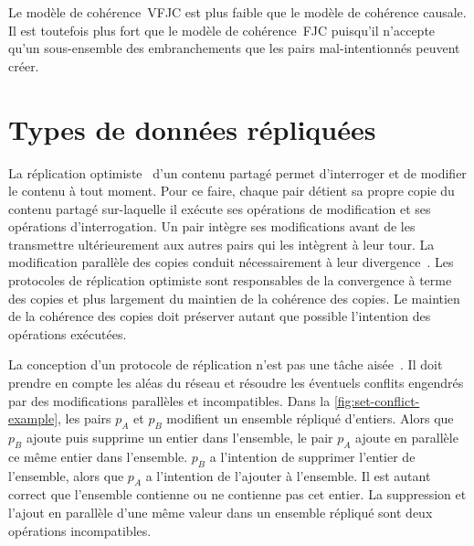Le modèle de cohérence~\ac{VFJC} est plus faible que le modèle de cohérence causale.
Il est toutefois plus fort que le modèle de cohérence~\ac{FJC} puisqu'il n'accepte qu'un sous-ensemble des embranchements que les pairs mal-intentionnés peuvent créer.




\clearpage %
\section{Types de données répliquées}\label{sec:crdt}

La réplication optimiste~\autocite{saito_2005_optimisticreplication} d'un contenu partagé permet d'interroger et de modifier le contenu à tout moment.
Pour ce faire, chaque pair détient sa propre copie du contenu partagé sur-laquelle il exécute ses opérations de modification et ses opérations d'interrogation.
Un pair intègre ses modifications avant de les transmettre ultérieurement aux autres pairs qui les intègrent à leur tour.
La modification parallèle des copies conduit nécessairement à leur divergence~\autocite{dourish_1995_divergence}.
Les protocoles de réplication optimiste sont responsables de la convergence à terme des copies et plus largement du maintien de la cohérence des copies.
Le maintien de la cohérence des copies doit préserver autant que possible l'intention des opérations exécutées.

La conception d'un protocole de réplication n'est pas une tâche aisée~\autocite{oster2005_otisuues}.
Il doit prendre en compte les aléas du réseau \autocite{rotem_falalcies_2006} et résoudre les éventuels conflits engendrés par des modifications parallèles et incompatibles.
Dans la \autoref{fig:set-conflict-example}, les pairs $p_A$ et $p_B$ modifient un ensemble répliqué d'entiers.
Alors que $p_B$ ajoute puis supprime un entier dans l'ensemble, le pair $p_A$ ajoute en parallèle ce même entier dans l'ensemble.
$p_B$ a l'intention de supprimer l'entier de l'ensemble, alors que $p_A$ a l'intention de l'ajouter à l'ensemble.
Il est autant correct que l'ensemble contienne ou ne contienne pas cet entier.
La suppression et l'ajout en parallèle d'une même valeur dans un ensemble répliqué sont deux opérations incompatibles.


